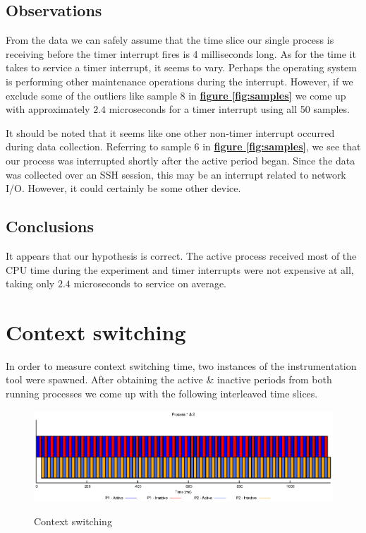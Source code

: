 \documentclass[oneside]{amsart}
\theoremstyle{definition}
\theoremstyle{remark}
\numberwithin{equation}{section}
\begin{document}
\subsection{Observations}
From the data we can safely assume that the time slice our single process is receiving before the
timer interrupt fires is 4 milliseconds long. As for the time it takes to service a timer interrupt,
it seems to vary. Perhaps the operating system is performing other maintenance operations during the
interrupt. However, if we exclude some of the outliers like sample 8 in
\hyperref[fig:samples]{\textbf{figure \ref*{fig:samples}}} we come up with approximately $2.4$
microseconds for a timer interrupt using all 50 samples.

It should be noted that it seems like one other non-timer interrupt occurred during data collection.
Referring to sample 6 in \hyperref[fig:samples]{\textbf{figure \ref*{fig:samples}}}, we see that our
process was interrupted shortly after the active period began. Since the data was collected over an
SSH session, this may be an interrupt related to network I/O. However, it could certainly be some
other device.

\subsection{Conclusions}
It appears that our hypothesis is correct. The active process received most of the CPU time during
the experiment and timer interrupts were not expensive at all, taking only $2.4$ microseconds to
service on average. \\

\newpage

\section{Context switching}
In order to measure context switching time, two instances of the instrumentation tool were spawned.
After obtaining the active \& inactive periods from both running processes we come up with the
following interleaved time slices.

\begin{figure}[h]
    \caption{Context switching}
    \centering
    \includegraphics[scale=1]{A1P2.eps}
    \label{fig:plot}
\end{figure}
\end{document}
